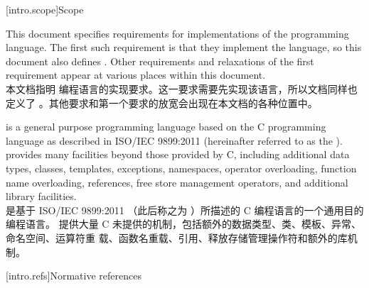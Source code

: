 
[intro.scope]{Scope}

\pnum
{}%
This document specifies requirements for implementations
of the \Cpp{} programming language. The first such requirement is that
they implement the language, so this document also
defines \Cpp{}. Other requirements and relaxations of the first
requirement appear at various places within this document.\\
本文档指明 \Cpp{} 编程语言的实现要求。这一要求需要先实现该语言，所以文档同样也定义了
\Cpp{}。其他要求和第一个要求的放宽会出现在本文档的各种位置中。

\pnum
\Cpp{} is a general purpose programming language based on the C
programming language as described in ISO/IEC 9899:2011
 (hereinafter referred to as the
). \Cpp{} provides many facilities
beyond those provided by C, including additional data types,
classes, templates, exceptions, namespaces, operator
overloading, function name overloading, references, free store
management operators, and additional library facilities.%
\\
\Cpp{} 是基于 ISO/IEC 9899:2011  
（此后称之为 ）所描述的 C 编程语言的一个通用目的编程语言。
\Cpp{} 提供大量 C 未提供的机制，包括额外的数据类型、类、模板、异常、命名空间、运算符重
载、函数名重载、引用、释放存储管理操作符和额外的库机制。%


%
[intro.refs]{Normative references}

